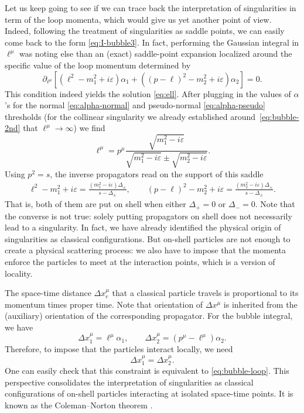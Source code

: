 \documentclass[12pt]{article}
\numberwithin{figure}{section}
\def \be {\begin{equation}}
\def \ee {\end{equation}}
\def \eps {\varepsilon}
\begin{document}
	Let us keep going to see if we can trace back the interpretation of singularities in term of the loop momenta, which would give us yet another point of view. Indeed, following the treatment of singularities as saddle points, we can easily come back to the form \eqref{eq:I-bubble3}. In fact, performing the Gaussian integral in $\ell^\mu$ was noting else than an (exact) saddle-point expansion localized around the specific value of the loop momentum determined by
	\be\label{eq:bubble-loop}
	\partial_{\ell^\mu} \!\left[ (\ell^2 - m_1^2 + i\eps)\alpha_1 + ((p-\ell)^2 - m_2^2 + i\eps)\alpha_2 \right] = 0.
	\ee
	This condition indeed yields the solution \eqref{eq:ell}. After plugging in the values of $\alpha$'s for the normal \eqref{eq:alpha-normal} and pseudo-normal \eqref{eq:alpha-pseudo} thresholds (for the collinear singularity we already established around~\eqref{eq:bubble-2nd} that $\ell^\mu \to \infty$) we find
	\be\label{eq:ell-bubble}
	\ell^\mu = p^\mu \frac{\sqrt{m_1^2 - i\eps}}{\sqrt{m_1^2 - i\eps} \pm \sqrt{m_2^2 - i\eps}}.
	\ee
	Using $p^2 = s$, the inverse propagators read on the support of this saddle
	\begin{align}
		\ell^2 - m_1^2 + i\eps = \frac{(m_1^2 - i\eps)\Delta_\pm  }{s - \Delta_\pm},\qquad (p-\ell)^2 - m_2^2 + i\eps = \frac{(m_2^2 - i\eps)\Delta_\pm}{s - \Delta_\pm}.
	\end{align}
	That is, both of them are put on shell when either $\Delta_+ = 0$ or $\Delta_-=0$. Note that the converse is not true: solely putting propagators on shell does not necessarily lead to a singularity. In fact, we have already identified the physical origin of singularities as classical configurations. But on-shell particles are not enough to create a physical scattering process: we also have to impose that the momenta enforce the particles to meet at the interaction points, which is a version of locality.
	
	The space-time distance $\Delta x_e^\mu$ that a classical particle travels is proportional to its momentum times proper time. Note that orientation of $\Delta x^\mu$ is inherited from the (auxiliary) orientation of the corresponding propagator. For the bubble integral, we have
	\be
	\Delta x_1^\mu = \ell^\mu \alpha_1, \qquad \Delta x_2^\mu = (p^\mu-\ell^\mu) \alpha_2.
	\ee
	Therefore, to impose that the particles interact locally, we need
	\be
	\Delta x_1^\mu = \Delta x_2^\mu.
	\ee
	One can easily check that this constraint is equivalent to \eqref{eq:bubble-loop}.
	This perspective consolidates the interpretation of singularities as classical configurations of on-shell particles interacting at isolated space-time points. It is known as the Coleman--Norton theorem \cite{Coleman:1965xm}.
	
\end{document}
